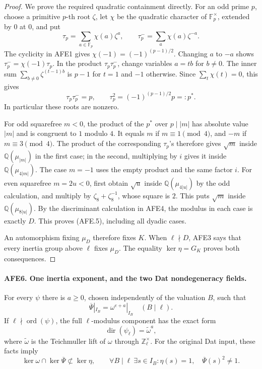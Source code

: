 \documentclass[11pt,a4paper]{article}
\numberwithin{equation}{section}
\theoremstyle{remark}\newtheorem{remark}[theorem]{Remark}
\begin{document}
\begin{proof}
We prove the required quadratic containment directly.
For an odd prime \(p\), choose a primitive \(p\)-th
root \(\zeta\), let \(\chi\) be the quadratic character
of \(\mathbb F_p^\times\), extended by \(0\) at \(0\),
and put
\[
       \tau_p=\sum_{a\in\mathbb F_p}\chi(a)\zeta^a,\qquad
       \tau_p^-=\sum_a\chi(a)\zeta^{-a}.
 \]
The cyclicity in AFE1 gives
\(\chi(-1)=(-1)^{(p-1)/2}\).  Changing \(a\) to \(-a\)
shows \(\tau_p^-=\chi(-1)\tau_p\).
In the product \(\tau_p\tau_p^-\), change variables
\(a=tb\) for \(b\ne0\).  The inner sum
\(\sum_{b\ne0}\zeta^{(t-1)b}\) is \(p-1\) for
\(t=1\) and \(-1\) otherwise.  Since
\(\sum_t\chi(t)=0\), this gives
\[
              \tau_p\tau_p^-=p,\qquad
              \tau_p^2=(-1)^{(p-1)/2}p=:p^*.
                                                        \tag{AFE.6}
\]
In particular these roots are nonzero.

For odd squarefree \(m<0\), the product of the \(p^*\)
over \(p\mid |m|\) has absolute value \(|m|\) and is
congruent to \(1\) modulo \(4\).  It equals \(m\) if
\(m\equiv1\pmod4\), and \(-m\) if \(m\equiv3\pmod4\).
The product of the corresponding \(\tau_p\)'s therefore
gives \(\sqrt m\) inside \(\mathbb Q(\mu_{|m|})\) in
the first case; in the second, multiplying by \(i\)
gives it inside \(\mathbb Q(\mu_{4|m|})\).
The case \(m=-1\) uses the empty product and the same
factor \(i\).
For even squarefree \(m=2u<0\), first obtain
\(\sqrt u\) inside \(\mathbb Q(\mu_{4|u|})\) by the
odd calculation, and multiply by
\(\zeta_8+\zeta_8^{-1}\), whose square is \(2\).
This puts \(\sqrt m\) inside
\(\mathbb Q(\mu_{8|u|})\).
By the discriminant calculation in AFE4, the modulus
in each case is exactly \(D\).
This proves (AFE.5), including all dyadic cases.

An automorphism fixing \(\mu_D\) therefore fixes \(K\).
When \(\ell\nmid D\), AFE3 says that every inertia
group above \(\ell\) fixes \(\mu_D\).
The equality \(\ker\eta=G_K\) proves both consequences.
\end{proof}

\paragraph{AFE6. One inertia exponent, and the two Dat nondegeneracy fields.}
\label{claim:AFE6}
For every \(\psi\) there is \(a\ge0\), chosen independently
of the valuation \(B\), such that
\[
       \overline\Psi|_{I_B}=\omega^{e+a}|_{I_B}
                       \quad(B\mid\ell).                 \tag{AFE.7}
\]
If \(\ell\nmid\operatorname{ord}(\psi)\), the full
\(\ell\)-modulus component has the exact form
\[
       \operatorname{dir}(\psi_\ell)=\widetilde\omega^a,
                                                        \tag{AFE.8}
\]
where \(\widetilde\omega\) is the Teichmuller lift of
\(\omega\) through \(\mathbb Z_\ell^\times\).
For the original Dat input, these facts imply
\[
 \ker\omega\cap\ker\overline\Psi\not\subset\ker\eta,\qquad
 \forall B\mid\ell\ \exists s\in I_B:
                  \eta(s)=1,\quad\overline\Psi(s)^2\ne1.
                                                        \tag{AFE.9}
\]
\end{document}
